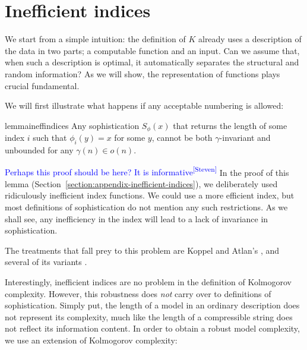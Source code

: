 \documentclass{style/llncs}
\newcommand{\s}{S}
\newcommand{\sdr}[1]{\textcolor{blue}{\small #1\textsuperscript{[Steven]} }}
\begin{document}
\section{Inefficient indices}
\label{section:indices}

We start from a simple intuition: the definition of $K$ already uses a description of the data in two parts; a computable function and an input. Can we assume that, when such a description is optimal, it automatically separates the structural and random information? As we will show, the representation of functions plays crucial fundamental.

We will first illustrate what happens if any acceptable numbering is allowed:
\begin{restatable}{lemma}{ineffindices}
Any sophistication $\s_\phi(x)$ that returns the length of some index $i$ such that $\phi_i(y) = x$ for some $y$, cannot be both $\gamma$-invariant and unbounded for any $\gamma(n) \in o(n)$.
 \end{restatable}
\sdr{Perhaps this proof should be here? It is informative}
\noindent In the proof of this lemma (Section~\ref{section:appendix-inefficient-indices}), we deliberately used ridiculously inefficient index functions. We could use a more efficient index, but most definitions of sophistication do not mention any such restrictions. As we shall see, any inefficiency in the index will lead to a lack of invariance in sophistication.

The treatments that fall prey to this problem are Koppel and Atlan's \cite{koppelSoph1988,koppel1991almost},  and several of its variants \cite{antunes2009sophistication,antunes2013sophistication}. 

Interestingly, inefficient indices are no problem in the definition of Kolmogorov complexity. However, this robustness does \emph{not} carry over to definitions of sophistication. Simply put, the length of a model in an ordinary description does not represent its complexity, much like the length of a compressible string does not reflect its information content. In order to obtain a robust model complexity, we use an extension of Kolmogorov complexity:
\end{document}

